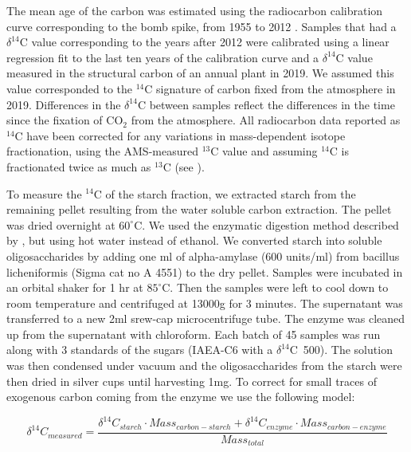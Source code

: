\documentclass{article}
\begin{document}
The mean age of the carbon was estimated using the radiocarbon calibration curve corresponding to the bomb spike, from 1955 to 2012 \citep{hua:2013}. Samples that had a $\delta^{14}$C value corresponding to the years after 2012 were calibrated using a linear regression fit to the last ten years of the calibration curve \citep{hua:2013}  and a $\delta^{14}$C value measured in the structural carbon of an annual plant in 2019. We assumed this value corresponded to the $^{14}$C signature of carbon fixed from the atmosphere in 2019. Differences in the $\delta^{14}$C between samples reflect the differences in the time since the fixation of CO$_{2}$ from the atmosphere. All radiocarbon data reported as $^{14}$C have been corrected for any variations in mass-dependent isotope fractionation, using the AMS-measured $^{13}$C value and assuming $^{14}$C is fractionated twice as much as $^{13}$C (see \citet{Trumbore2016}).
 
To measure the $^{14}$C of the starch fraction, we extracted starch from the remaining pellet resulting from the water soluble carbon extraction. The pellet was dried overnight at $60^{\circ}$C. We used the enzymatic digestion method described by \citet{Landhausser:2018aa}, but using hot water instead of ethanol. We converted starch into soluble oligosaccharides by adding one ml of alpha-amylase (600 units/ml) from bacillus licheniformis (Sigma cat no A 4551) to the dry pellet. Samples were incubated in an orbital shaker for 1 hr at $85^{\circ}$C. Then the samples were left to cool down to room temperature and centrifuged at 13000g for 3 minutes. The supernatant was transferred to a new 2ml srew-cap microcentrifuge tube. The enzyme was cleaned up from the supernatant with chloroform. Each batch of 45 samples was run along with 3 standards of the sugars (IAEA-C6 with a $\delta^{14}$C~500). The solution was then condensed under vacuum and the oligosaccharides from the starch were then dried in silver cups until harvesting 1mg. To correct for small traces of exogenous carbon coming from the enzyme we use the following model:

\begin{equation}
{\delta^{14}C_{measured}}=\frac{\delta^{14}C_{starch} \cdot Mass_{carbon-starch} + \delta^{14}C_{enzyme} \cdot Mass_{carbon-enzyme}}{Mass_{total}}
\label{starch_mass_balance_eq}
\end{equation}
\end{document}
